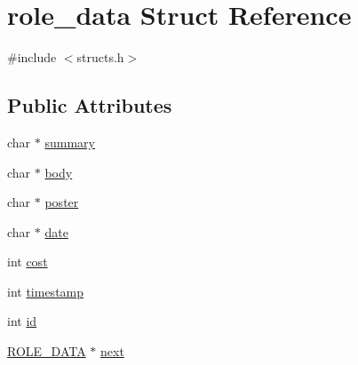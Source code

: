 \hypertarget{structrole__data}{\section{role\-\_\-data Struct Reference}
\label{structrole__data}
}


{\ttfamily \#include $<$structs.\-h$>$}

\subsection*{Public Attributes}
\begin{DoxyCompactItemize}
\item 
char $\ast$ \hyperlink{structrole__data_a2c9149ce91fbdf296bc7e6f5c1d49b74}{summary}
\item 
char $\ast$ \hyperlink{structrole__data_a52171559fdafc63e0383f45bd0db9c30}{body}
\item 
char $\ast$ \hyperlink{structrole__data_a1868bd646f4a34f7443a8f2646a8799a}{poster}
\item 
char $\ast$ \hyperlink{structrole__data_ac2201dc10fb1e79789b5b0a012603b0f}{date}
\item 
int \hyperlink{structrole__data_a371b44ddb9a1fa4a8b8d158cc5beaf1e}{cost}
\item 
int \hyperlink{structrole__data_a98237a9e860e04d15ba7628144489622}{timestamp}
\item 
int \hyperlink{structrole__data_a9d9be7e3de7e18725f2ae12f3a9f4b07}{id}
\item 
\hyperlink{structs_8h_a4b760d8457cc19a45975d817579fb6d0}{R\-O\-L\-E\-\_\-\-D\-A\-T\-A} $\ast$ \hyperlink{structrole__data_aa40a5d46afe438d463675aa5bea0a0ac}{next}
\end{DoxyCompactItemize}


